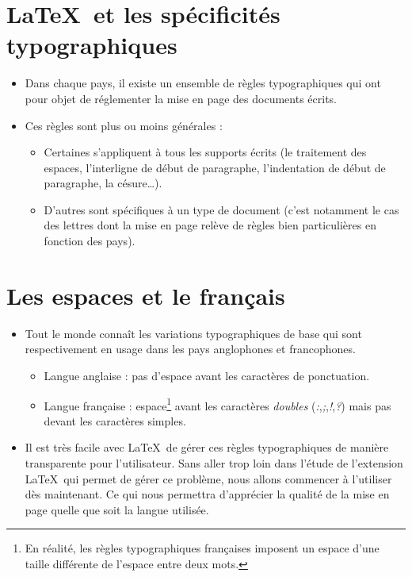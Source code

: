 






\section{\LaTeX\ et les spécificités typographiques}

\begin{itemize}
\item Dans chaque pays, il existe un ensemble de règles typographiques qui ont
  pour objet de réglementer la mise en page des documents écrits.
\item Ces règles sont plus ou moins générales :
  \begin{itemize}
  \item Certaines s'appliquent à tous les supports écrits (le traitement des
    espaces, l'interligne de début de paragraphe, l'indentation de début de
    paragraphe, la césure\ldots).
  \item D'autres sont spécifiques à un type de document (c'est notamment le cas
    des lettres dont la mise en page relève de règles bien particulières en
    fonction des pays).
  \end{itemize}
\end{itemize}


\section{Les espaces et le français}

\begin{itemize}
\item Tout le monde connaît les variations typographiques de base qui sont
  respectivement en usage dans les pays anglophones et francophones.
  \begin{itemize}
  \item Langue anglaise : pas d'espace avant les caractères de ponctuation.
  \item Langue française : espace\footnote{En réalité, les règles
      typographiques françaises imposent un espace d'une taille
      différente de l'espace entre deux mots.} avant les caractères
    \emph{doubles} (\emph{:},\emph{;},\emph{!},\emph{?}) mais pas
    devant les caractères simples.
  \end{itemize}
\item Il est très facile avec \LaTeX\ de gérer ces règles typographiques de
  manière transparente pour l'utilisateur. Sans aller trop loin dans l'étude de
  l'extension \LaTeX\ qui permet de gérer ce problème, nous allons commencer à
  l'utiliser dès maintenant. Ce qui nous permettra d'apprécier la qualité de la
  mise en page quelle que soit la langue utilisée.
\end{itemize}

